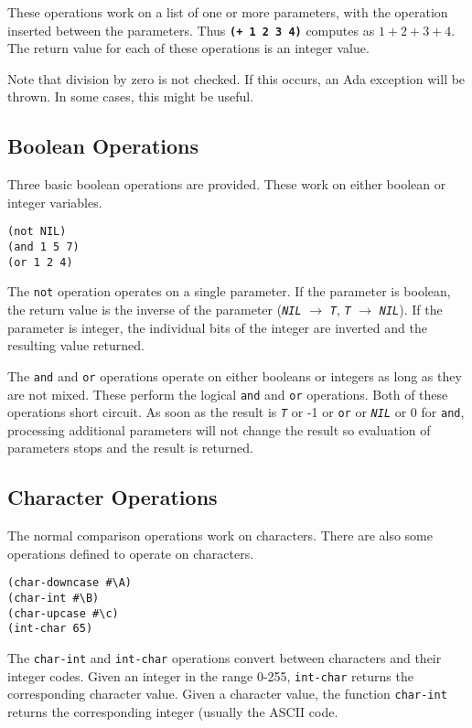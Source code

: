 \documentclass[10pt, openany]{book}
\newcommand{\operation}[1]{\textbf{\texttt{#1}}}
\newcommand{\function}[1]{\texttt{#1}}
\newcommand{\constant}[1]{\emph{\texttt{#1}}}
\begin{document}
These operations work on a list of one or more parameters, with the operation inserted between the parameters.  Thus \operation{(+ 1 2 3 4)} computes as $1+2+3+4$.  The return value for each of these operations is an integer value.

Note that division by zero is not checked.  If this occurs, an Ada exception will be thrown.  In some cases, this might be useful.

\subsection{Boolean Operations}
Three basic boolean operations are provided.  These work on either boolean or integer variables.
\begin{lstlisting}
(not NIL)
(and 1 5 7)
(or 1 2 4)
\end{lstlisting}

The \function{not} operation operates on a single parameter.  If the parameter is boolean, the return value is the inverse of the parameter (\constant{NIL} $\rightarrow$ \constant{T}, \constant{T} $\rightarrow$ \constant{NIL}).  If the parameter is integer, the individual bits of the integer are inverted and the resulting value returned.

The \function{and} and \function{or} operations operate on either booleans or integers as long as they are not mixed.  These perform the logical \function{and} and \function{or} operations.  Both of these operations short circuit.  As soon as the result is \constant{T} or -1 or \function{or} or \constant{NIL} or 0 for \function{and},  processing additional parameters will not change the result so evaluation of parameters stops and the result is returned.

\subsection{Character Operations}
The normal comparison operations work on characters.  There are also some operations defined to operate on characters.
\begin{lstlisting}
(char-downcase #\A)
(char-int #\B)
(char-upcase #\c)
(int-char 65)
\end{lstlisting}

The \function{char-int} and \function{int-char} operations convert between characters and their integer codes.  Given an integer in the range 0-255, \function{int-char} returns the corresponding character value.  Given a character value, the function \function{char-int} returns the corresponding integer (usually the ASCII code.
\end{document}
